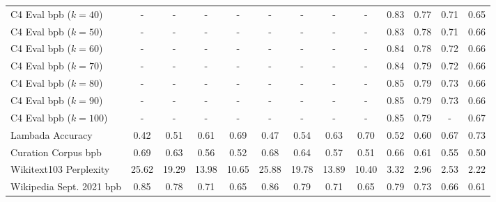 \documentclass[11pt, a4paper, logo]{deepmind}
\begin{document}
\begin{table}[h]
{\begin{tabular}{l |  c  c  c  c |  c  c  c  c |  c  c  c  c }
        C4 Eval bpb ($k={40}$) &
        - & - & - & - &
        - & - & - & - &
        0.83 & 0.77 & 0.71 & 0.65 \\
        
        C4 Eval bpb ($k={50}$) &
        - & - & - & - &
        - & - & - & - &
        0.83 & 0.78 & 0.71 & 0.66 \\
        
        C4 Eval bpb ($k={60}$) &
        - & - & - & - &
        - & - & - & - &
        0.84 & 0.78 & 0.72 & 0.66 \\
        
        C4 Eval bpb ($k={70}$) &
        - & - & - & - &
        - & - & - & - &
        0.84 & 0.79 & 0.72 & 0.66 \\
        
        C4 Eval bpb ($k={80}$) &
        - & - & - & - &
        - & - & - & - &
        0.85 & 0.79 & 0.73 & 0.66 \\
        
        C4 Eval bpb ($k={90}$) &
        - & - & - & - &
        - & - & - & - &
        0.85 & 0.79 & 0.73 & 0.66 \\
        
        C4 Eval bpb ($k={100}$) &
        - & - & - & - &
        - & - & - & - &
        0.85 & 0.79 & - & 0.67 \\


        \midrule
        
        Lambada Accuracy &
        0.42 & 0.51 & 0.61 & 0.69 &
        0.47 & 0.54 & 0.63 & 0.70 &
        0.52 & 0.60 & 0.67 & 0.73 \\
        
        Curation Corpus bpb &
        0.69 & 0.63 & 0.56 & 0.52 &
        0.68 & 0.64 & 0.57 & 0.51 &
        0.66 & 0.61 & 0.55 & 0.50 \\

        Wikitext103 Perplexity  &
        25.62 & 19.29 & 13.98 & 10.65 &
        25.88 & 19.78 & 13.89 & 10.40 &
        3.32 & 2.96 & 2.53 & 2.22 \\

        Wikipedia Sept. 2021 bpb &
        0.85 & 0.78 & 0.71 & 0.65 &
        0.86 & 0.79 & 0.71 & 0.65 &
        0.79 & 0.73 & 0.66 & 0.61 \\
        

    \end{tabular}

}
    \vspace{2.0mm}
    \centering
\end{table}
\end{document}
